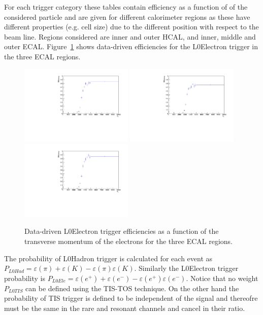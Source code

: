 For each trigger category these tables contain efficiency as a function of
\pt of the considered particle and are given for different calorimeter regions
as these have different properties (e.g. cell size) due to the different position
with respect to the beam line. Regions considered are inner and outer HCAL, and inner, middle and outer ECAL.
Figure~\ref{sec:L0eff_tables} shows data-driven efficiencies for the L0Electron trigger
in the three ECAL regions.

\begin{figure}[h!]
\centering
\includegraphics[width=0.48\textwidth]{RKst/figs/l0plots/l0E_Inner.pdf}
\includegraphics[width=0.48\textwidth]{RKst/figs/l0plots/l0E_Middle.pdf}
\includegraphics[width=0.48\textwidth]{RKst/figs/l0plots/l0E_Outer.pdf}
\caption{Data-driven L0Electron trigger efficiencies as a function of the transverse momentum
of the electrons for the three ECAL regions.}
\label{sec:L0eff_tables}
\end{figure}

The probability of L0Hadron trigger is calculated for each event as $P_{L0Had} = \varepsilon(\pi) + \varepsilon(K) - \varepsilon(\pi)\varepsilon(K)$.
Similarly the L0Electron trigger probability is $P_{L0Ele} = \varepsilon(e^+) + \varepsilon(e^-) - \varepsilon(e^+)\varepsilon(e^-)$.
Notice that no weight $P_{L0TIS}$ can be defined using the TIS-TOS technique. On the other hand
the probability of TIS trigger is defined to be independent of the signal and thereofre must be the same
in the rare and resonant channels and cancel in their ratio.

